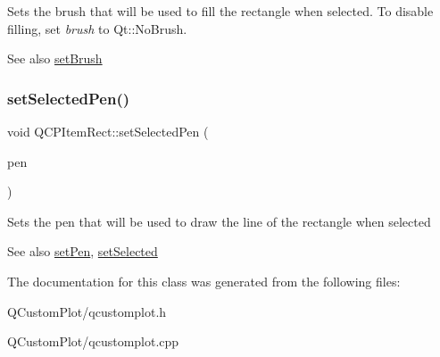 Sets the brush that will be used to fill the rectangle when selected. To disable filling, set {\itshape brush} to Qt\+::\+No\+Brush.

\begin{DoxySeeAlso}{See also}
\mbox{\hyperlink{class_q_c_p_item_rect_abbd4e346a03513ee466afc25d9c75446}{set\+Brush}} 
\end{DoxySeeAlso}
\mbox{\label{class_q_c_p_item_rect_a52a1bcb2dc753a538e406a2ba3cf21ce}} 
\subsubsection{\texorpdfstring{set\+Selected\+Pen()}{setSelectedPen()}}
{\footnotesize\ttfamily void Q\+C\+P\+Item\+Rect\+::set\+Selected\+Pen (\begin{DoxyParamCaption}\item[{const Q\+Pen \&}]{pen }\end{DoxyParamCaption})}

Sets the pen that will be used to draw the line of the rectangle when selected

\begin{DoxySeeAlso}{See also}
\mbox{\hyperlink{class_q_c_p_item_rect_a483c0da5a17e1646cd17ddea2c124e7d}{set\+Pen}}, \mbox{\hyperlink{class_q_c_p_abstract_item_a203de94ad586cc44d16c9565f49d3378}{set\+Selected}} 
\end{DoxySeeAlso}


The documentation for this class was generated from the following files\+:\begin{DoxyCompactItemize}
\item 
Q\+Custom\+Plot/qcustomplot.\+h\item 
Q\+Custom\+Plot/qcustomplot.\+cpp\end{DoxyCompactItemize}
